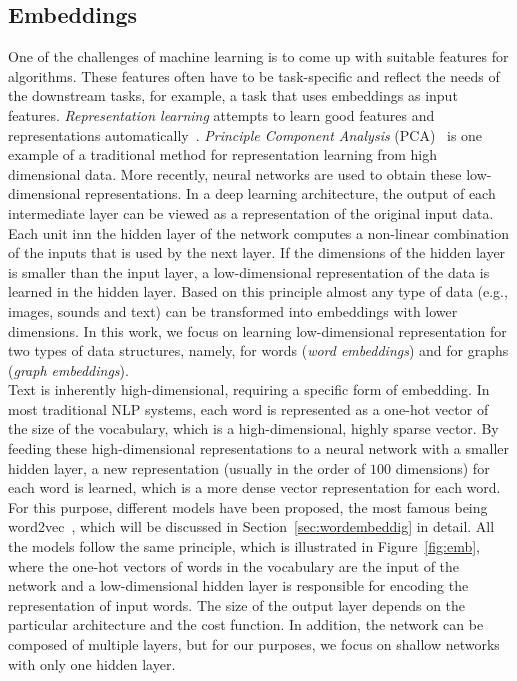 \subsection{Embeddings}\label{subsec:embeddings}
One of the challenges of machine learning is to come up with suitable features for algorithms. These features often have to be task-specific and reflect the needs of the downstream tasks, for example, a task that uses embeddings as input features. \emph{Representation learning} attempts to learn good features and representations automatically~. \emph{Principle Component Analysis} (PCA)~ is one example of a traditional method for representation learning from high dimensional data. More recently, neural networks are used to obtain these low-dimensional representations. In a deep learning architecture, the output of each intermediate layer can be viewed as a representation of the original input data. Each unit inn the hidden layer of the network computes a non-linear combination of the inputs that is used by the next layer.  If the dimensions of the hidden layer is smaller than the input layer, a low-dimensional representation of the data is learned in the hidden layer. Based on this principle almost any type of data (e.g., images, sounds and text) can be transformed into embeddings with lower dimensions. In this work, we focus on learning low-dimensional representation for two types of data structures, namely, for words (\emph{word embeddings}) and for graphs (\emph{graph embeddings}). \\
Text is inherently high-dimensional, requiring a specific form of embedding.
In most traditional NLP systems, each word is represented as a one-hot vector of the size of the vocabulary, which is a high-dimensional, highly sparse vector. 
By feeding these high-dimensional representations to a neural network with a smaller hidden layer, a new representation (usually in the order of $100$ dimensions) for each word is learned, which is a more dense vector representation for each word. For this purpose, different models have been proposed, the most famous being word2vec~, which will be discussed in Section~\ref{sec:wordembeddig} in detail. All the models follow the same principle, which is illustrated in Figure~\ref{fig:emb}, where the one-hot vectors of words in the vocabulary are the input of the network and a low-dimensional hidden layer is responsible for encoding the representation of input words.  The size of the output layer depends on the particular architecture and the cost function. In addition, the network can be composed of multiple layers, but for our purposes, we focus on shallow networks with only one hidden layer. \\
